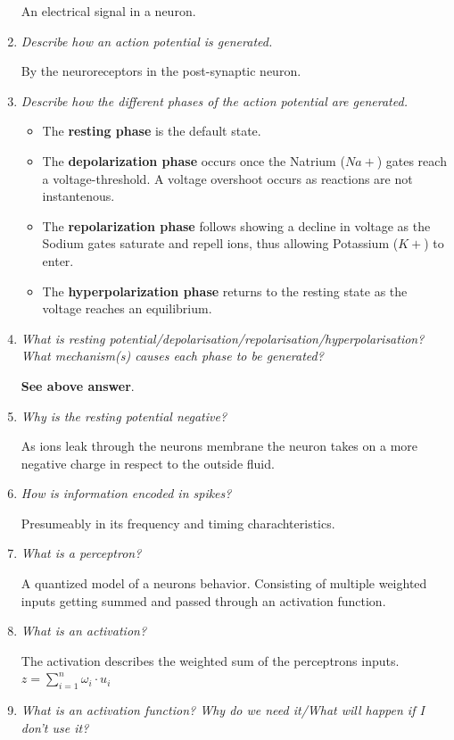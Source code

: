 \documentclass[
    fontsize      = 11pt,
    paper         = a4,
    twoside       = false,
    parskip       = half,
    pagesize      = false,
]{scrartcl}
\providecommand{\tightlist}{%
  \setlength{\itemsep}{0pt}\setlength{\parskip}{0pt}}
\begin{document}
\begin{enumerate}
  An electrical signal in a neuron.
\item
  \emph{Describe how an action potential is generated.}

  By the neuroreceptors in the post-synaptic neuron.
\item
  \emph{Describe how the different phases of the action potential are
  generated.}

  \begin{itemize}
  \tightlist
  \item
    The \textbf{resting phase} is the default state.
  \item
    The \textbf{depolarization phase} occurs once the Natrium (\(Na+\))
    gates reach a voltage-threshold. A voltage overshoot occurs as
    reactions are not instantenous.
  \item
    The \textbf{repolarization phase} follows showing a decline in
    voltage as the Sodium gates saturate and repell ions, thus allowing
    Potassium (\(K+\)) to enter.
  \item
    The \textbf{hyperpolarization phase} returns to the resting state as
    the voltage reaches an equilibrium.
  \end{itemize}
\item
  \emph{What is resting
  potential/depolarisation/repolarisation/hyperpolarisation? What
  mechanism(s) causes each phase to be generated?}

  \textbf{See above answer}.
\item
  \emph{Why is the resting potential negative?}

  As ions leak through the neurons membrane the neuron takes on a more
  negative charge in respect to the outside fluid.
\item
  \emph{How is information encoded in spikes?}

  Presumeably in its frequency and timing charachteristics.
\item
  \emph{What is a perceptron?}

  A quantized model of a neurons behavior. Consisting of multiple
  weighted inputs getting summed and passed through an activation
  function.
\item
  \emph{What is an activation?}

  The activation describes the weighted sum of the perceptrons inputs.
  \(z = \sum_{i=1}^n \omega_i \cdot u_i\)
\item
  \emph{What is an activation function? Why do we need it/What will
  happen if I don't use it?}


\end{enumerate}
\end{document}
